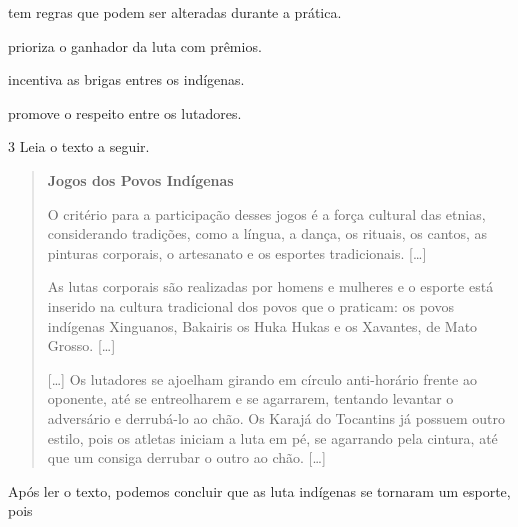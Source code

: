 \begin{escolha}
\item tem regras que podem ser alteradas durante a prática.

\item prioriza o ganhador da luta com prêmios.

\item incentiva as brigas entres os indígenas.

\item promove o respeito entre os lutadores.
\end{escolha}


\num{3} Leia o texto a seguir.

\begin{quote}
\textbf{Jogos dos Povos Indígenas}

O critério para a participação desses jogos é a força cultural das
etnias, considerando tradições, como a língua, a dança, os rituais, os
cantos, as pinturas corporais, o artesanato e os esportes tradicionais.
{[}\ldots{}{]}

As lutas corporais são realizadas por homens e mulheres e o esporte está
inserido na cultura tradicional dos povos que o praticam: os povos
indígenas Xinguanos, Bakairis os Huka Hukas e os Xavantes, de Mato
Grosso. {[}\ldots{}{]}

{[}\ldots{}{]} Os lutadores se ajoelham girando em círculo anti-horário
frente ao oponente, até se entreolharem e se agarrarem, tentando
levantar o adversário e derrubá-lo ao chão. Os Karajá do Tocantins já
possuem outro estilo, pois os atletas iniciam a luta em pé, se agarrando
pela cintura, até que um consiga derrubar o outro ao chão. {[}\ldots{}{]}

\end{quote}

\noindent{}Após ler o texto, podemos concluir que as luta indígenas se tornaram um
esporte, pois

